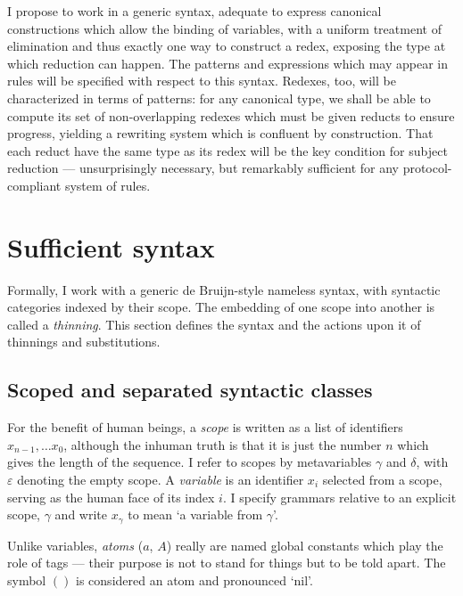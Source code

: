 \documentclass{jfp1}
\newcommand{\emp}{\varepsilon}
\begin{document}
I propose to work in a generic syntax, adequate to express canonical
constructions which allow the binding of variables, with a uniform
treatment of elimination and thus exactly one way to construct a
redex, exposing the type at which reduction can happen. The patterns
and expressions which may appear in rules will be specified with
respect to this syntax. Redexes, too, will be characterized in terms
of patterns: for any canonical type, we shall be able to compute its
set of non-overlapping redexes which must be given reducts to ensure
progress, yielding a rewriting system which is confluent by
construction. That each reduct have the same type as its redex
will be the key condition for subject reduction --- unsurprisingly
necessary, but remarkably sufficient for any protocol-compliant
system of rules.



\section{Sufficient syntax}

\newcommand{\la}[1]{\backslash #1\:}

Formally, I work with a generic de Bruijn-style nameless syntax, with syntactic
categories indexed by their scope. The embedding of one scope into another
is called a \emph{thinning}. This section defines the syntax and the actions
upon it of thinnings and substitutions.

\subsection{Scoped and separated syntactic classes}

For the benefit of human beings, a \emph{scope} is written as a list of identifiers $x_{n-1},\ldots x_0$, although the inhuman truth is that it is just the number $n$
which gives the length of the sequence. I refer to scopes by
metavariables $\gamma$ and $\delta$, with $\emp$ denoting the empty
scope. A \emph{variable} is an identifier $x_i$ selected from
a scope, serving as the human face of its index $i$. I specify grammars
relative to an explicit scope, $\gamma$ and write $x_\gamma$ to
mean `a variable from $\gamma$'.

Unlike variables, \emph{atoms} ($a$, $A$) really are named global
constants which play the role of tags --- their purpose is not
to stand for things but to be told apart. The symbol $()$ is
considered an atom and pronounced `nil'.
\end{document}
